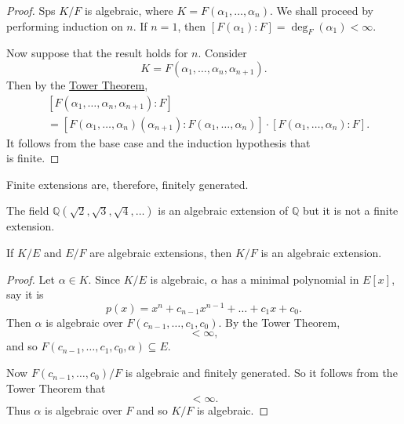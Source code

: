 \documentclass[notoc,notitlepage,nobib]{tufte-book}
\begin{document}
\begin{proof}
  Sps $K / F$ is algebraic, where $K = F(\alpha_1, \ldots, \alpha_n)$. We shall proceed by performing
  induction on $n$. If $n = 1$, then $[F(\alpha_1) : F] = \deg_F(\alpha_1) < \infty$.

  Now suppose that the result holds for $n$. Consider 
  \begin{equation*}
    K = F(\alpha_1, \ldots, \alpha_n, \alpha_{n + 1}).
  \end{equation*}
  Then by the \hyperref[thm:tower_theorem]{Tower Theorem},
  \begin{align*}
    &[F(\alpha_1, \ldots, \alpha_n, \alpha_{n + 1}) : F] \\
    &= [F(\alpha_1, \ldots, \alpha_{n})(\alpha_{n + 1}) : F(\alpha_1, \ldots,
    \alpha_n)] \cdot [F(\alpha_1, \ldots, \alpha_n) : F].
  \end{align*}
  It follows from the base case and the induction hypothesis that
  \begin{equation*}
    [F(\alpha_1, \ldots, \alpha_{n +1}):F]
  \end{equation*}
  is finite.
\end{proof}

\begin{note}
  Finite extensions are, therefore, finitely generated.
\end{note}

\begin{eg}
  The field $\mathbb{Q}(\sqrt{2}, \sqrt{3}, \sqrt{4}, \ldots)$ is an algebraic extension of $\mathbb{Q}$
  but it is not a finite extension.
\end{eg}

\begin{propo}\label{propo:greater_algebraic_extensions}
  If $K / E$ and $E / F$ are algebraic extensions, then $K / F$ is an algebraic extension.
\end{propo}

\begin{proof}
  Let $\alpha \in K$. Since $K / E$ is algebraic, $\alpha$ has a minimal polynomial in $E[x]$, say it is
  \begin{equation*}
    p(x) = x^n + c_{n - 1} x^{n - 1} + \hdots + c_1 x + c_0.
  \end{equation*}
  Then $\alpha$ is algebraic over $F(c_{n - 1}, \ldots, c_1, c_0)$. By the Tower Theorem,
  \begin{equation*}
    [F(c_{n - 1}, \ldots, c_1, c_0, \alpha) : F(c_{n - 1}, \ldots, c_0)] < \infty,
  \end{equation*}
  and so $F(c_{n - 1}, \ldots, c_1, c_0, \alpha) \subseteq E$.
  
  Now $F(c_{n - 1}, \ldots, c_0) / F$ is algebraic and finitely generated. So it follows from the Tower
  Theorem that
  \begin{equation*}
    [F(c_{n - 1}, \ldots, c_0, \alpha) : F] < \infty.
  \end{equation*}
  Thus $\alpha$ is algebraic over $F$ and so $K / F$ is algebraic.
\end{proof}
\end{document}
